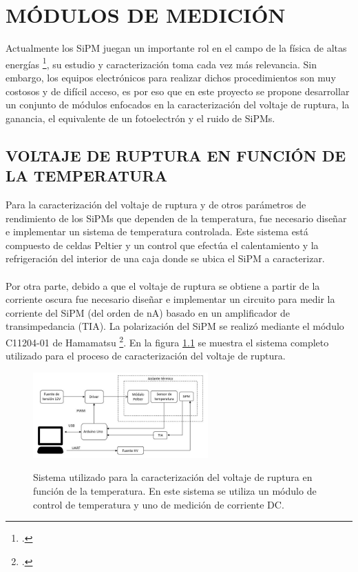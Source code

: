 \chapter{MÓDULOS DE MEDICIÓN}
\label{Cap:Modulos}
Actualmente los SiPM juegan un importante rol en el campo de la física de altas energías \footcite{Intro_SIPM_Sensl}, su estudio y caracterización toma cada vez más relevancia. Sin embargo, los equipos electrónicos para realizar dichos procedimientos son muy costosos y de difícil acceso, es por eso que en este proyecto se propone desarrollar un conjunto de módulos enfocados en la caracterización del voltaje de ruptura, la ganancia, el equivalente de un fotoelectrón y el ruido de SiPMs.  
\section{VOLTAJE DE RUPTURA EN FUNCIÓN DE LA TEMPERATURA}
Para la caracterización del voltaje de ruptura y de otros parámetros de rendimiento de los SiPMs que dependen de la temperatura, fue necesario diseñar e implementar un sistema de temperatura controlada. Este sistema está compuesto de celdas Peltier y un control que efectúa el calentamiento y la refrigeración del interior de una caja donde se ubica el SiPM a caracterizar.\\ \\
Por otra parte, debido a que el  voltaje de ruptura se obtiene a partir de la corriente oscura fue necesario diseñar e  implementar un circuito para medir la corriente del SiPM (del orden de nA) basado en un amplificador de transimpedancia (TIA). La polarización del SiPM se realizó mediante el módulo C11204-01 de Hamamatsu \footcite{Driver_mppc}. En la figura \ref{fig:complete_system} se muestra el sistema completo utilizado para el proceso de caracterización del voltaje de ruptura.
\begin{figure}[h!]
\begin{centering}
  \caption{Sistema utilizado para la caracterización del voltaje de ruptura en función de la temperatura. En este sistema se utiliza un módulo de control de temperatura y uno de medición de corriente DC.}
  \includegraphics[width=0.6\textwidth]{Images/Sistema_Completo_ruptura}
  \label{fig:complete_system}
  \par\end{centering}
\end{figure}

